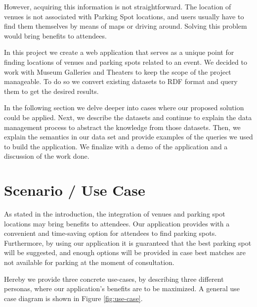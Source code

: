 \documentclass[runningheads,a4paper]{../../StyleFiles/llncs}
\begin{document}
However, acquiring this information is not straightforward. The location of venues is not associated with Parking Spot locations, and users usually have to find them themselves by means of maps or driving around. Solving this problem would bring benefits to attendees. %

In this project we create a web application that serves as a unique point for finding locations of venues and parking spots related to an event. We decided to work with Museum Galleries and Theaters to keep the scope of the project manageable. To do so we convert existing datasets to RDF format and query them to get the desired results.

In the following section we delve deeper into cases where our proposed solution could be applied. Next, we describe the datasets and continue to explain the data management process to abstract the knowledge from those datasets. Then, we explain the semantics in our data set and provide examples of the queries we used to build the application. We finalize with a demo of the application and a discussion of the work done.  

\section{Scenario / Use Case}

As stated in the introduction, the integration of venues and parking spot locations may bring benefits to attendees. Our application provides with a convenient and time-saving option for attendees to find parking spots. Furthermore, by using our application it is guaranteed that the best parking spot will be suggested, and enough options will be provided in case best matches are not available for parking at the moment of consultation.

Hereby we provide three concrete use-cases, by describing three different personas, where our application's benefits are to be maximized. A general use case diagram is shown in Figure \ref{fig:use-case}. 
\end{document}
